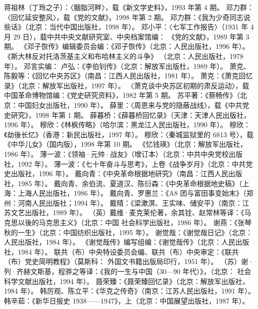 \begin{thebibliography}{999}
\bibitem{} 蒋祖林（丁玲之子）：〈胭脂河畔〉，载《新文学史料》，1993 年第 4 期。
\bibitem{} 邓力群：〈回忆延安整风〉，载《党的文献》，1998 年第 2 期。
\bibitem{} 邓力群：《我为少奇同志说些话》（北京：当代中国出版社，1998 年）。
\bibitem{} 邓小平：〈七军工作报告〉（1931 年 4 月 29 日），载中共中央文献研究室、中央档案馆编： 《党的文献》，1989 年第 3 期。
\bibitem{} 《邓子恢传》编辑委员会编：《邓子恢传》（北京：人民出版社，1996 年）。
\bibitem{} 《斯大林反对托洛茨基主义和布哈林主义的斗争》 （北京：人民出版社，1978 年）。
\bibitem{} 邓言实编： 卢弘：《李伯钊传》（北京：解放军出版杜，1989 年）。
\bibitem{} 萧克、陈毅等：《回忆中央苏区》（南昌：江西人民出版社，1981 年）。
\bibitem{} 萧克：《萧克回忆录》（北京：解放军出版社，1997 年）。
\bibitem{} 〈萧克谈中央苏区初期的肃反运动〉，载中国革命博物馆编：《党史研究资料》，1982 年第 5 期。
\bibitem{} 苏平著：《蔡畅传》（北京：中国妇女出版社，1990 年）。
\bibitem{} 薛里：〈周恩来与党的隐蔽战线〉，载《中共党史研究》，1998 年第 1 期。
\bibitem{} 薛暮桥：《薛暮桥回忆录》（天津：天津人民出版社，1996 年）。
\bibitem{} 穆欣：《林枫传略》（哈尔滨：黑龙江人民出版社，1990 年）。
\bibitem{} 穆欣：《劫後长忆》（香港：新民出版社，1997 年）。
\bibitem{} 穆欣：〈秦城监狱里的 6813 号〉，载《中华儿女》（国内版），1998 年第 10 期。
\bibitem{} 《忆钱瑛》（北京：解放军出版社，1986 年）。
\bibitem{} 薄一波：《领袖·元帅·战友》（增订本）（北京：中共中央党校出版社，1992 年）。
\bibitem{} 薄一波：《七十年奋斗与思考》，上卷《战争岁月》（北京：中共党史出版社，1996 年）。
\bibitem{} 戴向青：《中央革命根据地研究》（南昌：江西人民出版社，1985 年）。
\bibitem{} 戴向青、余伯流、夏道汉、陈衍森：《中央革命根据地史稿》（上海：上海人民出版社，1986 年）。
\bibitem{} 戴向青、罗惠兰：《A8 团与富田事变始末》（郑州：河南人民出版社；1994 年）。
\bibitem{} 戴晴：《梁漱溟、王实味、储安平》（南京：江苏文艺出版社，1989 年）。
\bibitem{} （英）戴维·麦克莱伦著，余其铨、赵常林等译：《马克思以後的马克思主义》（北京：中国 社会科学出版社，1986 年）。
\bibitem{} 谢燕：《张琴秋的一生》（北京：中国纺织出版社，1995 年）。
\bibitem{} 谢觉哉：《谢觉哉日记》（北京：人民出版社，1984 年）。
\bibitem{} 《谢觉哉传》编写组编：《谢觉哉传》（北京：人民出版社，1984 年）。
\bibitem{} 联共（布）中央特设委员会编、联共（布）中央审定：《联共（布）党史简明教程》（莫斯科： 外国文书籍出版局印行，1951 年）。
\bibitem{} （苏）谢·列·齐赫文斯基，程骅之等译：《我的一生与中国（30—90 年代）》，（北京： 社会科学文献出版社，1994 年）。
\bibitem{} 聂荣臻：《聂荣臻回忆录》（北京：解放军出版社，1984 年）。
\bibitem{} 韩厉观、陈立平：《华克之传奇》（南京：江苏人民出版社，1991 年）。
\bibitem{} 韩辛茹：《新华日报史 1938——1947》，上（北京：中国展望出版社，1987 年）。

\end{thebibliography}
